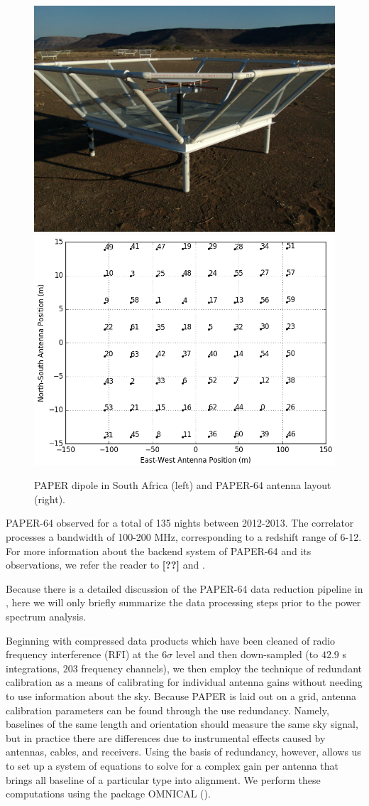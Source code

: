 \documentclass[preprint2,numberedappendix,tighten,twocolappendix]{aastex6}  %
\newcommand{\cc}[1]{{\color{purple} \textbf{[#1]}}}
\begin{document}
\begin{figure}
	\centering
	\includegraphics[height=0.35\textwidth]{plots/paper_dipole.png}
	\includegraphics[height=0.35\textwidth]{plots/antenna_layout.png}
	\caption{PAPER dipole in South Africa (left) and PAPER-64 antenna layout (right).}
	\label{fig:paper}
\end{figure}

PAPER-64 observed for a total of 135 nights between 2012-2013. The correlator processes a bandwidth of 100-200 MHz, corresponding to a redshift range of 6-12. For more information about the backend system of PAPER-64 and its observations, we refer the reader to \cc{??} and \citet{ali_et_al2015}.

Because there is a detailed discussion of the PAPER-64 data reduction pipeline in \citet{ali_et_al2015}, here we will only briefly summarize the data processing steps prior to the power spectrum analysis. 

Beginning with compressed data products which have been cleaned of radio frequency interference (RFI) at the $6\sigma$ level and then down-sampled (to $42.9$ s integrations, $203$ frequency channels), we then employ the technique of redundant calibration as a means of calibrating for individual antenna gains without needing to use information about the sky. Because PAPER is laid out on a grid, antenna calibration parameters can be found through the use redundancy. Namely, baselines of the same length and orientation should measure the same sky signal, but in practice there are differences due to instrumental effects caused by antennas, cables, and receivers. Using the basis of redundancy, however, allows us to set up a system of equations to solve for a complex gain per antenna that brings all baseline of a particular type into alignment. We perform these computations using the package OMNICAL (\citealt{zheng_et_al2014}).
\end{document}
